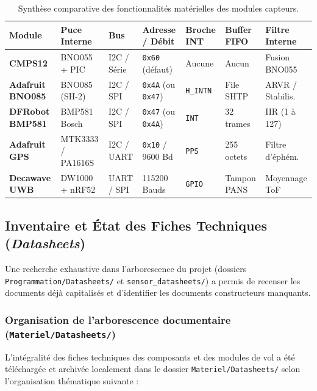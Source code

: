 \documentclass[../Materiel.tex]{subfiles}
\begin{document}
\begin{table}[htbp]
\centering
\small
\begin{tabular}{p{2.6cm} p{2.2cm} p{1.6cm} p{2.0cm} p{1.6cm} p{1.8cm} p{2.2cm}}
\toprule
\textbf{Module} & \textbf{Puce Interne} & \textbf{Bus} & \textbf{Adresse / Débit} & \textbf{Broche INT} & \textbf{Buffer FIFO} & \textbf{Filtre Interne} \\
\midrule
\textbf{CMPS12} & BNO055 + PIC & I2C / Série & \texttt{0x60} (défaut) & Aucune & Aucun & Fusion BNO055 \\
\addlinespace
\textbf{Adafruit BNO085} & BNO085 (SH-2) & I2C / SPI & \texttt{0x4A} (ou \texttt{0x47}) & \texttt{H\_INTN} & File SHTP & ARVR / Stabilis. \\
\addlinespace
\textbf{DFRobot BMP581} & BMP581 Bosch & I2C / SPI & \texttt{0x47} (ou \texttt{0x4A}) & \texttt{INT} & 32 trames & IIR (1 à 127) \\
\addlinespace
\textbf{Adafruit GPS} & MTK3333 / PA1616S & I2C / UART & \texttt{0x10} / 9600 Bd & \texttt{PPS} & 255 octets & Filtre d'éphém. \\
\addlinespace
\textbf{Decawave UWB} & DW1000 + nRF52 & UART / SPI & 115200 Bauds & \texttt{GPIO} & Tampon PANS & Moyennage ToF \\
\bottomrule
\end{tabular}
\caption{Synthèse comparative des fonctionnalités matérielles des modules capteurs.}
\label{tab:synthese_materielle}
\end{table}

\subsection{Inventaire et État des Fiches Techniques (\textit{Datasheets})}

Une recherche exhaustive dans l'arborescence du projet (dossiers \texttt{Programmation/Datasheets/} et \texttt{sensor\_datasheets/}) a permis de recenser les documents déjà capitalisés et d'identifier les documents constructeurs manquants.

\subsubsection{Organisation de l'arborescence documentaire (\texttt{Materiel/Datasheets/})}
L'intégralité des fiches techniques des composants et des modules de vol a été téléchargée et archivée localement dans le dossier \texttt{Materiel/Datasheets/} selon l'organisation thématique suivante :
\end{document}
